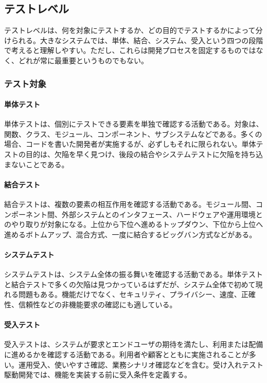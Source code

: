 \subsection{テストレベル}
テストレベルは、何を対象にテストするか、どの目的でテストするかによって分けられる。大きなシステムでは、単体、結合、システム、受入という四つの段階で考えると理解しやすい。ただし、これらは開発プロセスを固定するものではなく、どれが常に最重要というものでもない。

\subsubsection{テスト対象}
\paragraph{単体テスト}
単体テストは、個別にテストできる要素を単独で確認する活動である。対象は、関数、クラス、モジュール、コンポーネント、サブシステムなどである。多くの場合、コードを書いた開発者が実施するが、必ずしもそれに限られない。単体テストの目的は、欠陥を早く見つけ、後段の結合やシステムテストに欠陥を持ち込まないことである。

\paragraph{結合テスト}
結合テストは、複数の要素の相互作用を確認する活動である。モジュール間、コンポーネント間、外部システムとのインタフェース、ハードウェアや運用環境とのやり取りが対象になる。上位から下位へ進めるトップダウン、下位から上位へ進めるボトムアップ、混合方式、一度に結合するビッグバン方式などがある。

\paragraph{システムテスト}
システムテストは、システム全体の振る舞いを確認する活動である。単体テストと結合テストで多くの欠陥は見つかっているはずだが、システム全体で初めて現れる問題もある。機能だけでなく、セキュリティ、プライバシー、速度、正確性、信頼性などの非機能要求の確認にも適している。

\paragraph{受入テスト}
受入テストは、システムが要求とエンドユーザの期待を満たし、利用または配備に進めるかを確認する活動である。利用者や顧客とともに実施されることが多い。運用受入、使いやすさ確認、業務シナリオ確認などを含む。受け入れテスト駆動開発では、機能を実装する前に受入条件を定義する。

